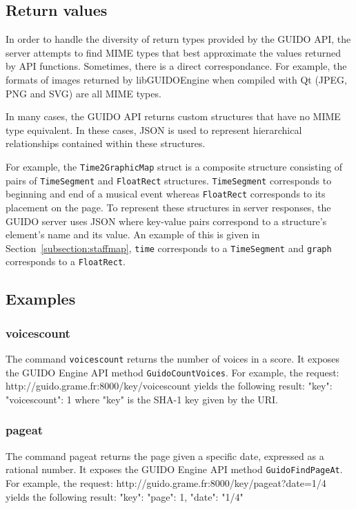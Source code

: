 \documentclass[11pt,a4paper]{article}
\newenvironment{code}		{\vspace{-2mm} \fontsize{8.5pt}{12pt}\selectfont \verbatim}{\endverbatim\vspace{-2mm}}
\newenvironment{mcode}		{\vspace{-2mm} \fontsize{10pt}{12pt}\selectfont \verbatim}{\endverbatim\vspace{-2mm}}
\begin{document}
\subsection{Return values}
In order to handle the diversity of return types provided by the GUIDO API, the server attempts to find MIME types that best approximate the values returned by API functions.  Sometimes, there is a direct correspondance.  For example, the formats of images returned by libGUIDOEngine when compiled with Qt (JPEG, PNG and SVG) are all MIME types.\par
In many cases, the GUIDO API returns custom structures that have no MIME type equivalent.  In these cases, JSON \cite{json} is used to represent hierarchical relationships contained within these structures.\par
For example, the \verb=Time2GraphicMap= struct is a composite structure consisting of pairs of \verb=TimeSegment= and \verb=FloatRect= structures.  \verb=TimeSegment= corresponds to beginning and end of a musical event whereas \verb=FloatRect= corresponds to its placement on the page.  To represent these structures in server responses, the GUIDO server uses JSON where key-value pairs correspond to a structure's element's name and its value. An example of this is given in Section~\ref{subsection:staffmap}, \verb=time= corresponds to a \verb=TimeSegment= and \verb=graph= corresponds to a \verb=FloatRect=.
\subsection{Examples}

\subsubsection{voicescount}
The command \verb=voicescount= returns the number of voices in a score.  It exposes the GUIDO Engine API method \verb=GuidoCountVoices=.  For example, the request:
\begin{mcode}
 http://guido.grame.fr:8000/key/voicescount
\end{mcode}
yields the following result:
\begin{mcode}
 {
   "key": {
     "voicescount": 1
   }
 }
\end{mcode}
where "key" is the SHA-1 key given by the URI.
~

\subsubsection{pageat}
The command pageat returns the page given a specific date, expressed as a rational number.  It exposes the GUIDO Engine API method \verb=GuidoFindPageAt=.  For example, the request:
\begin{code}
 http://guido.grame.fr:8000/key/pageat?date=1/4
\end{code}
yields the following result:
\begin{mcode}
{
  "key": {
    "page": 1,
    "date": "1/4"
  }
}
\end{mcode}
\end{document}

